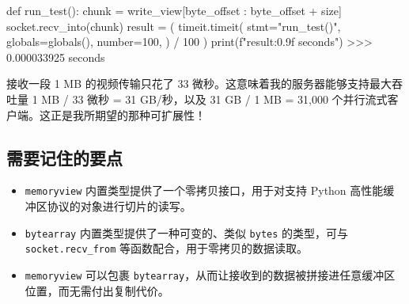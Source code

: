 \begin{codebox}[python]
def run_test():
    chunk = write_view[byte_offset : byte_offset + size]
    socket.recv_into(chunk)
    result = (
        timeit.timeit(
            stmt="run_test()",
            globals=globals(),
            number=100,
        )
        / 100
    )
    print(f"{result:0.9f} seconds")
>>>
0.000033925 seconds
\end{codebox}

接收一段 1 MB 的视频传输只花了 33 微秒。这意味着我的服务器能够支持最大吞吐量 1 MB / 33 微秒 = 31 GB/秒，以及 31 GB / 1 MB = 31,000 个并行流式客户端。这正是我所期望的那种可扩展性！

\subsection{需要记住的要点}

\begin{itemize}
\item \texttt{memoryview} 内置类型提供了一个零拷贝接口，用于对支持 Python 高性能缓冲区协议的对象进行切片的读写。
\item \texttt{bytearray} 内置类型提供了一种可变的、类似 \texttt{bytes} 的类型，可与 \texttt{socket.recv\_from} 等函数配合，用于零拷贝的数据读取。
\item \texttt{memoryview} 可以包裹 \texttt{bytearray}，从而让接收到的数据被拼接进任意缓冲区位置，而无需付出复制代价。
\end{itemize}
